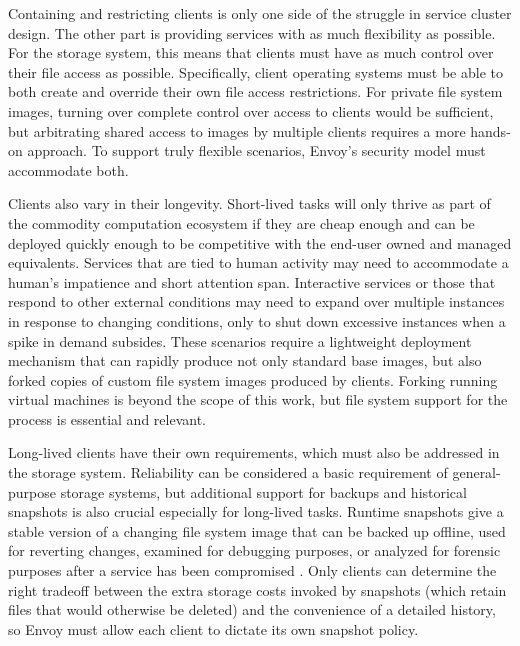 Containing and restricting clients is only one side of the struggle in service cluster design. The other part is providing services with as much flexibility as possible. For the storage system, this means that clients must have as much control over their file access as possible. Specifically, client operating systems must be able to both create and override their own file access restrictions. For private file system images, turning over complete control over access to clients would be sufficient, but arbitrating shared access to images by multiple clients requires a more hands-on approach. To support truly flexible scenarios, Envoy's security model must accommodate both.

Clients also vary in their longevity. Short-lived tasks will only thrive as part of the commodity computation ecosystem if they are cheap enough and can be deployed quickly enough to be competitive with the end-user owned and managed equivalents. Services that are tied to human activity may need to accommodate a human's impatience and short attention span. Interactive services or those that respond to other external conditions may need to expand over multiple instances in response to changing conditions, only to shut down excessive instances when a spike in demand subsides. These scenarios require a lightweight deployment mechanism that can rapidly produce not only standard base images, but also forked copies of custom file system images produced by clients. Forking running virtual machines is beyond the scope of this work, but file system support for the process is essential and relevant.

Long-lived clients have their own requirements, which must also be addressed in the storage system. Reliability can be considered a basic requirement of general-purpose storage systems, but additional support for backups and historical snapshots is also crucial especially for long-lived tasks. Runtime snapshots give a stable version of a changing file system image that can be backed up offline, used for reverting changes, examined for debugging purposes, or analyzed for forensic purposes after a service has been compromised \cite{king,whitaker04}. Only clients can determine the right tradeoff between the extra storage costs invoked by snapshots (which retain files that would otherwise be deleted) and the convenience of a detailed history, so Envoy must allow each client to dictate its own snapshot policy.

